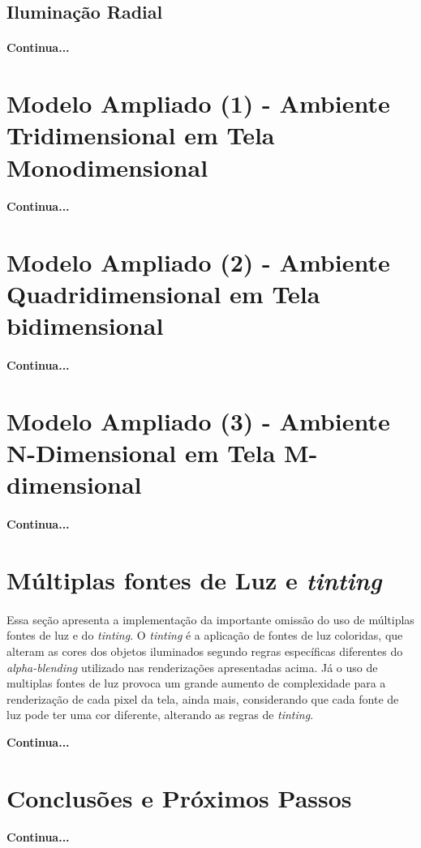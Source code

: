 \documentclass{article}
\begin{document}
	\subsection{Iluminação Radial}
	
	\paragraph{}
	\textbf{Continua...}
	
	\section{Modelo Ampliado (1) - Ambiente Tridimensional em Tela Monodimensional}
	
	\paragraph{}
	\textbf{Continua...}
	
	\section{Modelo Ampliado (2) - Ambiente Quadridimensional em Tela bidimensional}
	
	\paragraph{}
	\textbf{Continua...}
	
	\section{Modelo Ampliado (3) - Ambiente N-Dimensional em Tela M-dimensional}
	
	\paragraph{}
	\textbf{Continua...}
	
	\section{Múltiplas fontes de Luz e \textit{tinting}}
	
	\paragraph{}
	Essa seção apresenta a implementação da importante omissão do uso de múltiplas fontes de luz e do \textit{tinting}. O \textit{tinting} é a aplicação de fontes de luz coloridas, que alteram as cores dos objetos iluminados segundo regras específicas diferentes do \textit{alpha-blending} utilizado nas renderizações apresentadas acima. Já o uso de multiplas fontes de luz provoca um grande aumento de complexidade para a renderização de cada pixel da tela, ainda mais, considerando que cada fonte de luz pode ter uma cor diferente, alterando as regras de \textit{tinting}.
	
	\textbf{Continua...}
	
	\section{Conclusões e Próximos Passos}
	
	\paragraph{}
	\textbf{Continua...}

	
\end{document}
